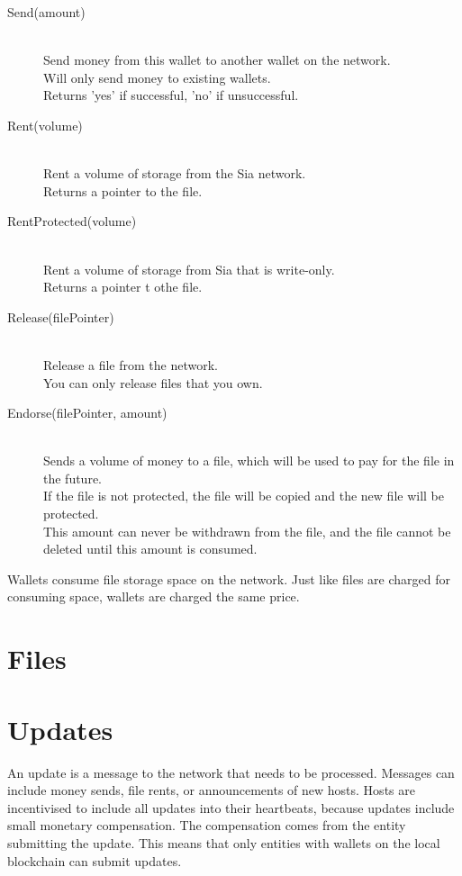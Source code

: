 \documentclass[twocolumn]{article}
\begin{document}
\begin{description}
	\item[Send(amount)] \hfill \\
	Send money from this wallet to another wallet on the network. \\
	Will only send money to existing wallets. \\
	Returns 'yes' if successful, 'no' if unsuccessful.
	\item[Rent(volume)] \hfill \\
	Rent a volume of storage from the Sia network. \\
	Returns a pointer to the file.
	\item[RentProtected(volume)] \hfill \\
	Rent a volume of storage from Sia that is write-only. \\
	Returns a pointer t othe file.
	\item[Release(filePointer)] \hfill \\
	Release a file from the network. \\
	You can only release files that you own.
	\item[Endorse(filePointer, amount)] \hfill \\
	Sends a volume of money to a file, which will be used to pay for the file in the future. \\
	If the file is not protected, the file will be copied and the new file will be protected. \\
	This amount can never be withdrawn from the file, and the file cannot be deleted until this amount is consumed.
\end{description}

Wallets consume file storage space on the network.
Just like files are charged for consuming space, wallets are charged the same price.


\section{Files}

\section{Updates}

An update is a message to the network that needs to be processed.
Messages can include money sends, file rents, or announcements of new hosts.
Hosts are incentivised to include all updates into their heartbeats, because updates include small monetary compensation.
The compensation comes from the entity submitting the update.
This means that only entities with wallets on the local blockchain can submit updates.
\end{document}
